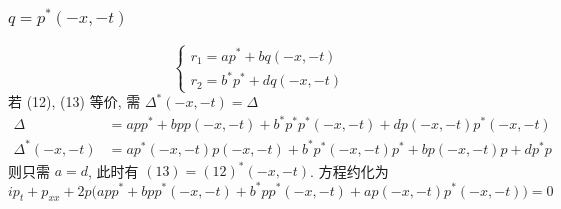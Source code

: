\subsubsection{$ q = p^{*}(-x,-t)$}
\begin{equation*}
    \begin{cases}
        r_1 = ap^{*}+bq(-x,-t) \\
        r_2 = b^{*}p^{*} + dq(-x,-t) 
    \end{cases}
\end{equation*}
若 (12), (13) 等价, 需 $ \Delta^{*}(-x,-t) = \Delta $
\begin{equation*}
    \begin{aligned}
        \Delta &= app^{*} + bpp(-x,-t) + b^{*}p^{*}p^{*}(-x,-t) + dp(-x,-t)p^{*}(-x,-t) \\
        \Delta^{*}(-x,-t) &= ap^{*}(-x,-t)p(-x,-t) + b^{*}p^{*}(-x,-t)p^{*} + bp(-x,-t)p + dp^{*}p 
    \end{aligned}
\end{equation*} 
则只需 $ a = d $, 此时有 $ (13) = (12)^{*}(-x,-t) $. 方程约化为
\begin{equation*}
    ip_{t} + p_{xx} + 2p\big(app^{*} + bpp^{*}(-x,-t) + b^{*}pp^{*}(-x,-t) + ap(-x,-t)p^{*}(-x,-t)\big) = 0
\end{equation*}


